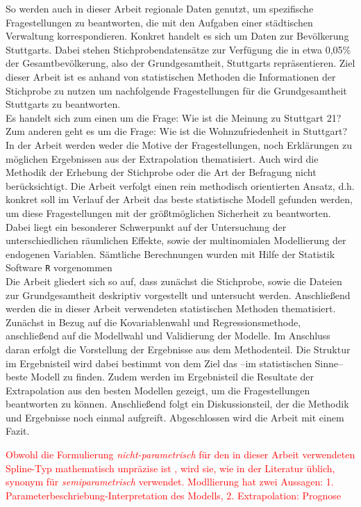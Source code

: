 \documentclass{Vorlage}
\begin{document}
So werden auch in dieser Arbeit regionale Daten genutzt, um spezifische Fragestellungen zu beantworten, die mit den Aufgaben einer städtischen Verwaltung korrespondieren. Konkret handelt es sich um Daten zur Bevölkerung Stuttgarts. Dabei stehen Stichprobendatensätze zur Verfügung die in etwa 0,05\% der Gesamtbevölkerung, also der Grundgesamtheit, Stuttgarts repräsentieren. Ziel dieser Arbeit ist es anhand von statistischen Methoden die Informationen der Stichprobe zu nutzen um nachfolgende Fragestellungen für die Grundgesamtheit Stuttgarts zu beantworten.\\
Es handelt sich zum einen um die Frage: Wie ist die Meinung zu Stuttgart 21? Zum anderen geht es um die Frage: Wie ist die Wohnzufriedenheit in Stuttgart?\\
In der Arbeit werden weder die Motive der Fragestellungen, noch Erklärungen zu möglichen Ergebnissen aus der Extrapolation thematisiert. Auch wird die Methodik der Erhebung der Stichprobe oder die Art der Befragung nicht berücksichtigt. Die Arbeit verfolgt einen rein methodisch orientierten Ansatz, d.h. konkret soll im Verlauf der Arbeit das beste statistische Modell gefunden werden, um diese Fragestellungen mit der größtmöglichen Sicherheit zu beantworten. Dabei liegt ein besonderer Schwerpunkt auf der Untersuchung der unterschiedlichen räumlichen Effekte, sowie der multinomialen Modellierung der endogenen Variablen. Sämtliche Berechnungen wurden mit Hilfe der Statistik Software \texttt{R} vorgenommen \cite{RCore} \\
Die Arbeit gliedert sich so auf, dass zunächst die Stichprobe, sowie die Dateien zur Grundgesamtheit deskriptiv vorgestellt und untersucht werden. Anschließend werden die in dieser Arbeit verwendeten statistischen Methoden thematisiert. Zunächst in Bezug auf die Kovariablenwahl und Regressionsmethode, anschließend auf die Modellwahl und Validierung der Modelle. Im Anschluss daran erfolgt die Vorstellung der Ergebnisse aus dem Methodenteil. Die Struktur im Ergebnisteil wird dabei bestimmt von dem Ziel das --im statistischen Sinne-- beste Modell zu finden. Zudem werden im Ergebnisteil die Resultate der Extrapolation aus den besten Modellen gezeigt, um die Fragestellungen beantworten zu können. Anschließend folgt ein Diskussionsteil, der die Methodik und Ergebnisse noch einmal aufgreift. Abgeschlossen wird die Arbeit mit einem Fazit.

\textcolor{red}{Obwohl die Formulierung \textit{nicht-parametrisch} für den in dieser Arbeit verwendeten Spline-Typ mathematisch unpräzise ist \cite[p. 1]{eilers1996}, wird sie, wie in der Literatur üblich, synonym für \textit{semiparametrisch} verwendet.
Modllierung hat zwei Aussagen: 1. Parameterbeschriebung-Interpretation des Modells, 2. Extrapolation: Prognose}
\end{document}
